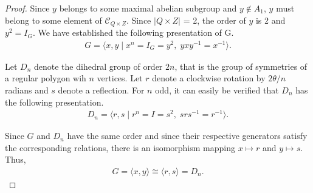 \begin{proof}





Since $y$ belongs to some maximal abelian subgroup and $y \not \in A_1$, $y$ must belong to some element of $\mathcal{C}_{Q \times Z}$. Since $|Q \times Z|$ = 2, the order of $y$ is 2 and $y^2 = I_G$. We have established the following presentation of G.
\begin{align*} G = \langle x, y \; | \; x^n = I_G = y^2, \; y x y^{-1} = x^{-1} \rangle.
\end{align*}

Let $D_n$ denote the dihedral group of order $2n$, that is the group of symmetries of a regular polygon wih $n$ vertices. Let $r$ denote a clockwise rotation by $2\theta /n$ radians and $s$ denote a reflection. For $n$ odd, it can easily be verified that $D_n$ has the following presentation.
\begin{align*} D_n = \langle r, s \; | \; r^n = I = s^2, \; s r s^{-1} = r^{-1} \rangle.
\end{align*}

Since $G$ and $D_n$ have the same order and since their respective generators satisfy the corresponding relations, there is an isomorphism mapping $x \mapsto r$ and $y \mapsto s$. Thus,
\begin{align*} G = \langle x, y \rangle \cong \langle r, s \rangle = D_n.
\end{align*}


\end{proof}
